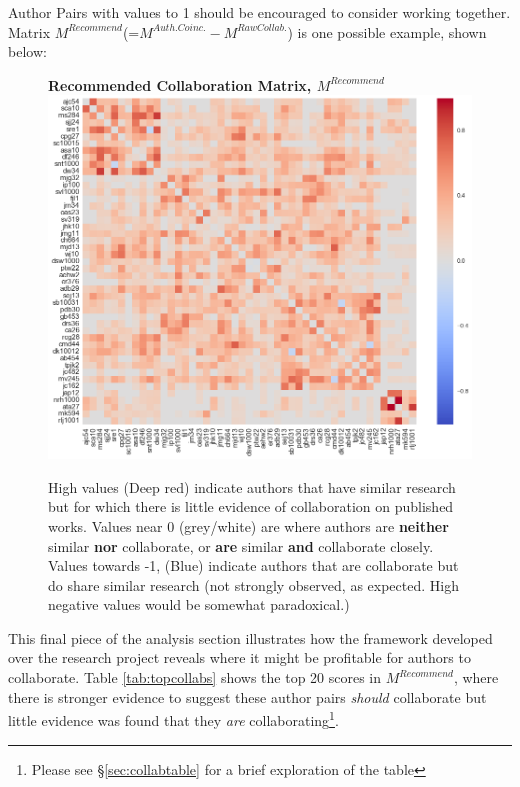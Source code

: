 Author Pairs with values to 1 should be encouraged to consider working together. Matrix $M^{Recommend}$(=$M^{Auth. Coinc.}-M^{Raw Collab.}$) is one possible example, shown below:
\begin{center}
\begin{figure}[H]
  \centering
  \textbf{Recommended Collaboration Matrix, $M^{Recommend}$}
    \includegraphics[width=\textwidth]{Analysis/Recommending_Mat.png}
    \caption[Recommended Collaboration Matrix]{High values (Deep red) indicate authors that have similar research but for which there is little evidence of collaboration on published works. Values near 0 (grey/white) are where authors are \textbf{neither} similar \textbf{nor} collaborate, or \textbf{are} similar \textbf{and} collaborate closely. Values towards -1, (Blue) indicate authors that are collaborate but do share similar research (not strongly observed, as expected. High negative values would be somewhat paradoxical.) }
    \label{fig:RECOMM_MAT}
\end{figure} 
\end{center}
This final piece of the analysis section illustrates how the framework developed over the research project reveals where it might be profitable for authors to collaborate. Table \ref{tab:topcollabs} shows the top 20 scores in $M^{Recommend}$, where there is stronger evidence to suggest these author pairs \emph{should} collaborate but little evidence was found that they \emph{are} collaborating\footnote{Please see \S\ref{sec:collabtable} for a brief exploration of the table}.
